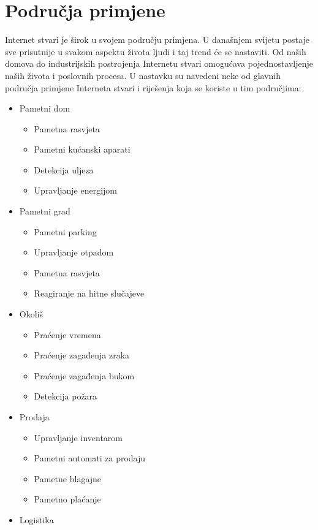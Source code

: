 \documentclass[times, utf8, diplomski]{fer}
\begin{document}
\section{Područja primjene}
Internet stvari je širok u svojem području primjena. U današnjem svijetu postaje sve prisutnije u svakom aspektu života ljudi i taj trend će se nastaviti. Od naših domova do industrijskih postrojenja Internetu stvari omogućava pojednostavljenje naših života i poslovnih procesa. U nastavku su navedeni neke od glavnih područja primjene Interneta stvari i riješenja koja se koriste u tim područjima:
\begin{itemize}
    \item Pametni dom
    \begin{itemize}
        \item Pametna rasvjeta
        \item Pametni kućanski aparati
        \item Detekcija uljeza
        \item Upravljanje energijom
    \end{itemize}
    \item Pametni grad
    \begin{itemize}
        \item Pametni parking
        \item Upravljanje otpadom
        \item Pametna rasvjeta
        \item Reagiranje na hitne slučajeve
    \end{itemize}
    \item Okoliš
    \begin{itemize}
        \item Praćenje vremena
        \item Praćenje zagađenja zraka
        \item Praćenje zagađenja bukom
        \item Detekcija požara
    \end{itemize}
    \item Prodaja
    \begin{itemize}
        \item Upravljanje inventarom
        \item Pametni automati za prodaju
        \item Pametne blagajne
        \item Pametno plaćanje
    \end{itemize}
    \item Logistika

\end{itemize}
\end{document}
